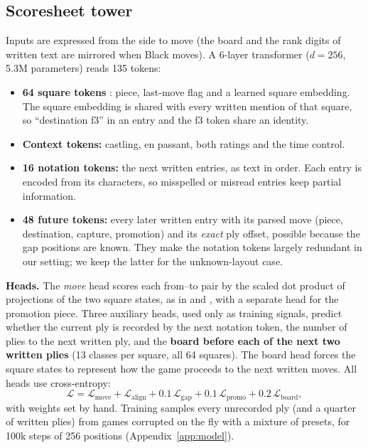 \documentclass[11pt]{article}
\begin{document}
\subsection{Scoresheet tower}
\label{sec:tower}
Inputs are expressed from the side to move (the board and the rank digits of written text are mirrored when Black moves). A 6-layer transformer \citep{vaswani2017attention} ($d=256$, 5.3M parameters) reads 135 tokens:
\begin{itemize}
  \item \textbf{64 square tokens} \citep{monroe2024mastering,maia3}: piece, last-move flag and a learned square embedding. The square embedding is shared with every written mention of that square, so ``destination f3'' in an entry and the f3 token share an identity.
  \item \textbf{Context tokens:} castling, en passant, both ratings and the time control.
  \item \textbf{16 notation tokens:} the next written entries, as text in order. Each entry is encoded from its characters, so misspelled or misread entries keep partial information.
  \item \textbf{48 future tokens:} every later written entry with its parsed move (piece, destination, capture, promotion) and its \emph{exact} ply offset, possible because the gap positions are known. They make the notation tokens largely redundant in our setting; we keep the latter for the unknown-layout case.
\end{itemize}
\textbf{Heads.} The \emph{move} head scores each from--to pair by the scaled dot product of projections of the two square states, as in \citet{monroe2024mastering} and \citet{maia3}, with a separate head for the promotion piece. Three auxiliary heads, used only as training signals, predict whether the current ply is recorded by the next notation token, the number of plies to the next written ply, and the \textbf{board before each of the next two written plies} (13 classes per square, all 64 squares). The board head forces the square states to represent how the game proceeds to the next written moves. All heads use cross-entropy:
\[
\mathcal L=\mathcal L_{\text{move}}+\mathcal L_{\text{align}}+0.1\,\mathcal L_{\text{gap}}+0.1\,\mathcal L_{\text{promo}}+0.2\,\mathcal L_{\text{board}},
\]
with weights set by hand. Training samples every unrecorded ply (and a quarter of written plies) from games corrupted on the fly with a mixture of presets, for 100k steps of 256 positions (Appendix~\ref{app:model}).
\end{document}
